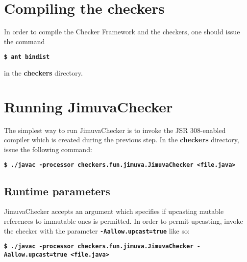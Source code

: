 \documentclass{pracamgr}
\theoremstyle{break}
\theoremstyle{break}
\theoremstyle{break}
\begin{document}
\section{Compiling the checkers}
\label{sec:compiling}

In order to compile the Checker Framework and the checkers, one should
issue the command

\indent \textbf{\texttt{\$ ant bindist}}

\noindent in the \textbf{checkers} directory. 

\section{Running JimuvaChecker}

The simplest way to run JimuvaChecker is to invoke the JSR 308-enabled
compiler which is created during the previous step. In the
\textbf{checkers} directory, issue the following command:

\indent \textbf{\texttt{\$ ./javac -processor checkers.fun.jimuva.JimuvaChecker <file.java>}}

\subsection{Runtime parameters}

JimuvaChecker accepts an argument which specifies if upcasting mutable
references to immutable ones is permitted. In order to permit
upcasting, invoke the checker with the parameter
\textbf{\texttt{-Aallow.upcast=true}} like so:

\indent \textbf{\texttt{\small{\$ ./javac -processor checkers.fun.jimuva.JimuvaChecker -Aallow.upcast=true <file.java>}}}

{}

\end{document}
